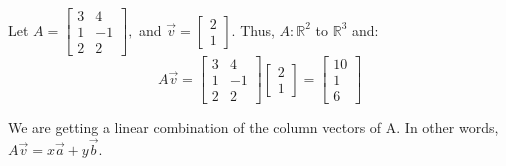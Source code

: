 \documentclass[../main.tex]{subfiles}
\begin{document}
\begin{example}
    
    Let \( A = \begin{bmatrix}
        3 & 4 \\
        1 & -1 \\
        2 & 2 
    \end{bmatrix}, \) and
    \( \vec{v} = \begin{bmatrix}
        2 \\
        1
    \end{bmatrix} \).
    Thus, \( A: \mathbb{R}^2 \) to \( \mathbb{R}^3 \) and:
    \[
        A\vec{v} = \begin{bmatrix}
            3 & 4 \\
            1 & -1 \\
            2 & 2 
        \end{bmatrix}
        \begin{bmatrix}
            2 \\
            1
        \end{bmatrix}
        =
        \begin{bmatrix}
            10 \\
            1 \\
            6
        \end{bmatrix}
    \]

    \begin{note}
        We are getting a linear combination of the column vectors of A.
        In other words, \( A \vec{v} = x \vec{a}+ y \vec{b} \).
    \end{note}
\end{example}
\end{document}
